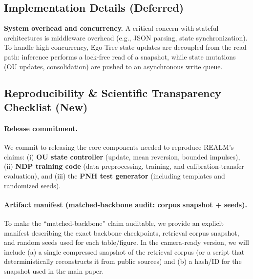 \documentclass{article}
\begin{document}
\subsection{Implementation Details (Deferred)}
\label{app:impl-details}
\textbf{System overhead and concurrency.} A critical concern with stateful architectures is middleware overhead (e.g., JSON parsing, state synchronization). To handle high concurrency, Ego-Tree state updates are decoupled from the read path: inference performs a lock-free read of a snapshot, while state mutations (OU updates, consolidation) are pushed to an asynchronous write queue.

\subsection{Reproducibility \& Scientific Transparency Checklist (New)}
\label{app:repro-checklist}
\paragraph{Release commitment.}
We commit to releasing the core components needed to reproduce REALM's claims:
(i) \textbf{OU state controller} (update, mean reversion, bounded impulses),
(ii) \textbf{NDP training code} (data preprocessing, training, and calibration-transfer evaluation), and
(iii) the \textbf{PNH test generator} (including templates and randomized seeds).

\paragraph{Artifact manifest (matched-backbone audit: corpus snapshot + seeds).}
To make the ``matched-backbone'' claim auditable, we provide an explicit manifest describing the exact backbone checkpoints, retrieval corpus snapshot, and random seeds used for each table/figure.
In the camera-ready version, we will include (a) a single compressed snapshot of the retrieval corpus (or a script that deterministically reconstructs it from public sources) and (b) a hash/ID for the snapshot used in the main paper.
\end{document}
